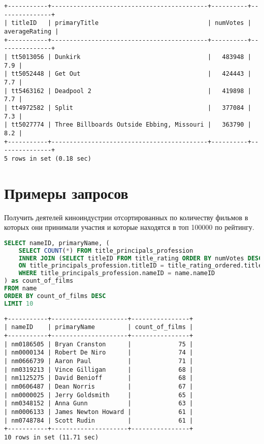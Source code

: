 \documentclass[12pt,a4paper]{article}
\begin{document}
\begin{lstlisting}[basicstyle = \tiny\ttfamily, columns = fixed]
+-----------+-------------------------------------------+----------+---------------+
| titleID   | primaryTitle                              | numVotes | averageRating |
+-----------+-------------------------------------------+----------+---------------+
| tt5013056 | Dunkirk                                   |   483948 |           7.9 |
| tt5052448 | Get Out                                   |   424443 |           7.7 |
| tt5463162 | Deadpool 2                                |   419898 |           7.7 |
| tt4972582 | Split                                     |   377084 |           7.3 |
| tt5027774 | Three Billboards Outside Ebbing, Missouri |   363790 |           8.2 |
+-----------+-------------------------------------------+----------+---------------+
5 rows in set (0.18 sec)
\end{lstlisting}

\section{Примеры запросов}

Получить деятелей киноиндустрии отсортированных по количеству фильмов 
в которых они принимали участия и которые находятся в топ 100000 по рейтингу.

\begin{lstlisting}[language=SQL]
SELECT nameID, primaryName, (
	SELECT COUNT(*) FROM title_principals_profession
	INNER JOIN (SELECT titleID FROM title_rating ORDER BY numVotes DESC, averageRating DESC LIMIT 10000) as title_rating_ordered
    ON title_principals_profession.titleID = title_rating_ordered.titleID
    WHERE title_principals_profession.nameID = name.nameID
) as count_of_films
FROM name
ORDER BY count_of_films DESC
LIMIT 10
\end{lstlisting}

\begin{lstlisting}[basicstyle = \tiny\ttfamily, columns = fixed]
+-----------+---------------------+----------------+
| nameID    | primaryName         | count_of_films |
+-----------+---------------------+----------------+
| nm0186505 | Bryan Cranston      |             75 |
| nm0000134 | Robert De Niro      |             74 |
| nm0666739 | Aaron Paul          |             71 |
| nm0319213 | Vince Gilligan      |             68 |
| nm1125275 | David Benioff       |             68 |
| nm0606487 | Dean Norris         |             67 |
| nm0000025 | Jerry Goldsmith     |             65 |
| nm0348152 | Anna Gunn           |             63 |
| nm0006133 | James Newton Howard |             61 |
| nm0748784 | Scott Rudin         |             61 |
+-----------+---------------------+----------------+
10 rows in set (11.71 sec)    
\end{lstlisting}
\end{document}
